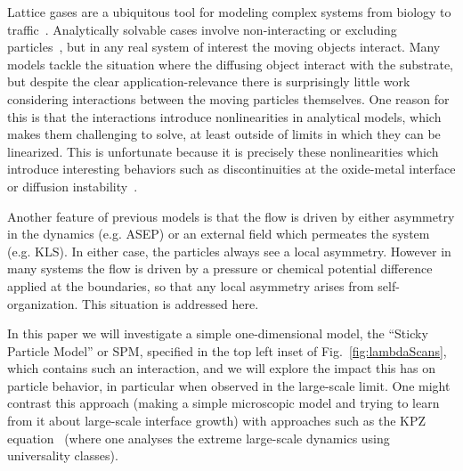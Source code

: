 \documentclass[
reprint, amsmath,amssymb, aps,
]{revtex4-1}
\begin{document}
Lattice gases are a ubiquitous tool for modeling complex systems from
biology to traffic~\cite{1742-5468-2011-07-P07007, Mobilia2007,
  tegner2015high, zhu2012atomic, DealGrove1965, MottCabrera1949,
  Buzzaccaro2007}.  Analytically solvable cases involve
non-interacting or excluding particles~\cite{ladd1988application,
  liggett1985interacting, BenNaim1999, Shandarin1989, Frachebourg1999,
  Frachebourg2000}, but in any real system of interest the moving
objects interact. Many models tackle the situation where the diffusing
object interact with the substrate, but despite the clear
application-relevance there is surprisingly little work considering
interactions between the moving particles themselves.  One reason for
this is that the interactions introduce nonlinearities in analytical
models, which makes them challenging to solve, at least outside of
limits in which they can be linearized. This is unfortunate because it
is precisely these nonlinearities which introduce interesting
behaviors such as discontinuities at the oxide-metal interface or
diffusion instability~\cite{Obukhovsky2017, Gorokhova2010}.

Another feature of previous models is that the flow is driven by
either asymmetry in the dynamics (e.g. ASEP) or an external field
which permeates the system (e.g. KLS).  In either case, the particles
always see a local asymmetry.  However in many systems the flow is
driven by a pressure or chemical potential difference applied at the
boundaries, so that any local asymmetry arises from self-organization.
This situation is addressed here.

In this paper we will investigate a simple one-dimensional model, the
``Sticky Particle Model'' or SPM, specified in the top left inset of
Fig.~\ref{fig:lambdaScans}, which contains such an interaction, and we
will explore the impact this has on particle behavior, in particular
when observed in the large-scale limit.  One might contrast this
approach (making a simple microscopic model and trying to learn from
it about large-scale interface growth) with approaches such as the KPZ
equation~\cite{PhysRevLett.56.889, PhysRevA.38.4271, Sasamoto2010}
(where one analyses the extreme large-scale dynamics using
universality classes).

\end{document}
